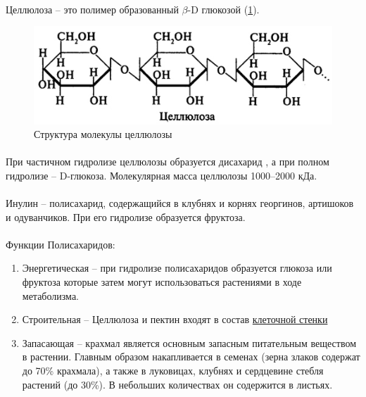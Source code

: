 \paragraph*{}Целлюлоза -- это полимер образованный $\beta$-D глюкозой (\ris \ref{cell_mol}).

\begin{figure}[h!]
  \centering
       \includegraphics[width=0.5\linewidth]{pictures/cell_mol}
\caption{Структура молекулы целлюлозы}
\label{cell_mol}
\end{figure}

\paragraph*{}При частичном гидролизе целлюлозы образуется дисахарид , а при полном гидролизе – D-глюкоза. Молекулярная масса целлюлозы 1000–2000 кДа. 

\paragraph*{}Инулин – полисахарид, содержащийся в клубнях и корнях георгинов, артишоков и одуванчиков. При его гидролизе образуется фруктоза.

\paragraph*{}Функции Полисахаридов:

\begin{enumerate}

	\item Энергетическая -- при гидролизе полисахаридов образуется глюкоза или фруктоза которые затем могут использоваться растениями в ходе метаболизма.
	\item Строительная -- Целлюлоза и пектин входят в состав \hyperlink{cell_wall}{клеточной стенки}
	\item Запасающая -- крахмал является основным запасным питательным веществом в растении. Главным образом накапливается в семенах (зерна злаков содержат до 70\% крахмала), а также в луковицах, клубнях и сердцевине стебля растений (до 30\%). В небольших количествах он содержится в листьях.

\end{enumerate}

